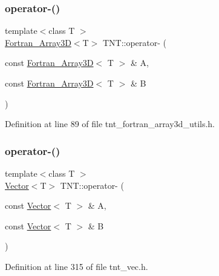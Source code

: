 \subsubsection{\texorpdfstring{operator-\/()}{operator-()}\hspace{0.1cm}{\footnotesize\ttfamily [5/7]}}
{\footnotesize\ttfamily template$<$class T $>$ \\
\hyperlink{classTNT_1_1Fortran__Array3D}{Fortran\+\_\+\+Array3D}$<$T$>$ T\+N\+T\+::operator-\/ (\begin{DoxyParamCaption}\item[{const \hyperlink{classTNT_1_1Fortran__Array3D}{Fortran\+\_\+\+Array3D}$<$ T $>$ \&}]{A,  }\item[{const \hyperlink{classTNT_1_1Fortran__Array3D}{Fortran\+\_\+\+Array3D}$<$ T $>$ \&}]{B }\end{DoxyParamCaption})}



Definition at line 89 of file tnt\+\_\+fortran\+\_\+array3d\+\_\+utils.\+h.

\mbox{\label{namespaceTNT_a1be3c1e84293029bae011fb0d5c8f82a}} 
\subsubsection{\texorpdfstring{operator-\/()}{operator-()}\hspace{0.1cm}{\footnotesize\ttfamily [6/7]}}
{\footnotesize\ttfamily template$<$class T $>$ \\
\hyperlink{classTNT_1_1Vector}{Vector}$<$T$>$ T\+N\+T\+::operator-\/ (\begin{DoxyParamCaption}\item[{const \hyperlink{classTNT_1_1Vector}{Vector}$<$ T $>$ \&}]{A,  }\item[{const \hyperlink{classTNT_1_1Vector}{Vector}$<$ T $>$ \&}]{B }\end{DoxyParamCaption})}



Definition at line 315 of file tnt\+\_\+vec.\+h.

\mbox{\label{namespaceTNT_ad00860a15fba14ffc48b8a3c620aee8f}} 
